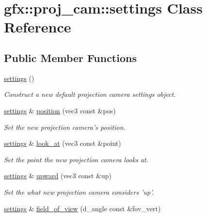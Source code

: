\hypertarget{classgfx_1_1proj__cam_1_1settings}{\section{gfx\-:\-:proj\-\_\-cam\-:\-:settings Class Reference}
\label{classgfx_1_1proj__cam_1_1settings}
}
\subsection*{Public Member Functions}
\begin{DoxyCompactItemize}
\item 
\hyperlink{classgfx_1_1proj__cam_1_1settings_af22728a8d4da91c67569cd5732c061a6}{settings} ()
\begin{DoxyCompactList}\small\item\em Construct a new default projection camera settings object. \end{DoxyCompactList}\item 
\hyperlink{classgfx_1_1proj__cam_1_1settings}{settings} \& \hyperlink{classgfx_1_1proj__cam_1_1settings_ade85e327bee8e0adb8cb150c19d8c484}{position} (vec3 const \&pos)
\begin{DoxyCompactList}\small\item\em Set the new projection camera's position. \end{DoxyCompactList}\item 
\hyperlink{classgfx_1_1proj__cam_1_1settings}{settings} \& \hyperlink{classgfx_1_1proj__cam_1_1settings_a3fd8d0b49213b71883253076ac244675}{look\-\_\-at} (vec3 const \&point)
\begin{DoxyCompactList}\small\item\em Set the point the new projection camera looks at. \end{DoxyCompactList}\item 
\hyperlink{classgfx_1_1proj__cam_1_1settings}{settings} \& \hyperlink{classgfx_1_1proj__cam_1_1settings_ac298e4e4bea07e9fea7f8f1ec073746e}{upward} (vec3 const \&up)
\begin{DoxyCompactList}\small\item\em Set the what new projection camera considers 'up'. \end{DoxyCompactList}\item 
\hyperlink{classgfx_1_1proj__cam_1_1settings}{settings} \& \hyperlink{classgfx_1_1proj__cam_1_1settings_aae956f82f4b9b48f667381e1f1a7ecd6}{field\-\_\-of\-\_\-view} (d\-\_\-angle const \&fov\-\_\-vert)

\end{DoxyCompactItemize}
